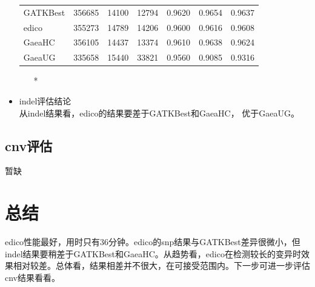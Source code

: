 \documentclass[UTF8,10pt,a4paper]{ctexart}
\begin{document}
\begin{itemize}
\begin{table}[htp]
{\begin{center}
\begin{tabular}{p{2cm}|p{2cm}|p{2cm}|p{2cm}|p{2cm}|p{2cm}|p{2cm}}
\hline
GATKBest & 356685 & 14100 & 12794 & 0.9620 & 0.9654 & 0.9637 \\
edico & 355273 & 14789 & 14206 & 0.9600 & 0.9616 & 0.9608 \\
GaeaHC& 356105 & 14437 & 13374 & 0.9610 & 0.9638 & 0.9624 \\
GaeaUG & 335658 & 15440 & 33821 & 0.9560 & 0.9085  & 0.9316\\
\hline
\end{tabular}
\end{center}
\label{default}
}
\begin{itemize}
\item[*] {}
\end{itemize}
\end{table}
\item indel评估结论 \\
	从indel结果看，edico的结果要差于GATKBest和GaeaHC， 优于GaeaUG。
\end{itemize}

\subsection{cnv评估}
暂缺

\section{总结}
edico性能最好，用时只有36分钟。edico的snp结果与GATKBest差异很微小，但indel结果要稍差于GATKBest和GaeaHC。从趋势看，edico在检测较长的变异时效果相对较差。总体看，结果相差并不很大，在可接受范围内。下一步可进一步评估cnv结果看看。


% 

\begin{figure}[htbp]
\begin{center}
\label{variantType}
\end{center}
\end{figure}
\end{document}
